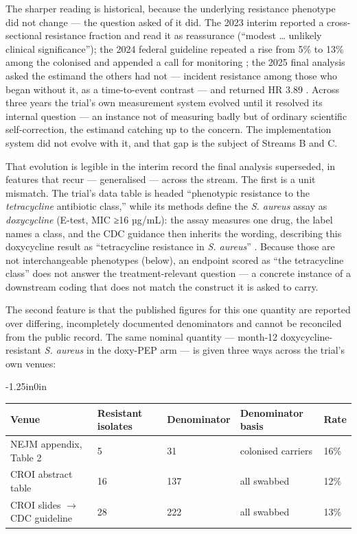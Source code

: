 \documentclass[10pt,letterpaper]{article}
\begin{document}
The sharper reading is historical, because the underlying resistance phenotype did not change
--- the question asked of it did. The 2023 interim reported a
cross-sectional resistance fraction and read it as reassurance (``modest
\ldots{} unlikely clinical significance''); the 2024 federal guideline
repeated a rise from 5\% to 13\% among the colonised and appended a call
for monitoring \cite{cdc2024doxypep}; the 2025 final analysis asked the
estimand the others had not --- incident resistance among those who
began without it, as a time-to-event contrast --- and returned HR 3.89
\cite{luetkemeyer2025}. Across three years the trial's own measurement
system evolved until it resolved its internal question --- an instance
not of measuring badly but of ordinary scientific self-correction, the
estimand catching up to the concern. The implementation system did not
evolve with it, and that gap is the subject of Streams B and C.

That evolution is legible in the interim record the final analysis
superseded, in features that recur --- generalised --- across the
stream. The first is a unit mismatch. The trial's data table is headed
``phenotypic resistance to the \emph{tetracycline} antibiotic class,''
while its methods define the \emph{S. aureus} assay as
\emph{doxycycline} (E-test, MIC ≥16 µg/mL): the assay measures one drug,
the label names a class, and the CDC guidance then inherits the wording,
describing this doxycycline result as ``tetracycline resistance in
\emph{S. aureus}'' \cite{cdc2024doxypep}. Because those are not
interchangeable phenotypes (below), an endpoint scored as ``the
tetracycline class'' does not answer the treatment-relevant question ---
a concrete instance of a downstream coding that does not match the
construct it is asked to carry.

The second feature is that the published figures for this one quantity
are reported over differing, incompletely documented denominators and
cannot be reconciled from the public record. The same nominal quantity
--- month-12 doxycycline-resistant \emph{S. aureus} in the doxy-PEP arm
--- is given three ways across the trial's own venues:

\begin{adjustwidth}{-1.25in}{0in}
\centering
\begin{tabular}{lllll}
\hline
Venue & Resistant isolates & Denominator & Denominator basis & Rate \\ \hline
NEJM appendix, Table 2 & 5 & 31 & colonised carriers & 16\% \\
CROI abstract table & 16 & 137 & all swabbed & 12\% \\
CROI slides $\rightarrow$ CDC guideline & 28 & 222 & all swabbed & 13\% \\ \hline
\end{tabular}
\end{adjustwidth}
\end{document}
